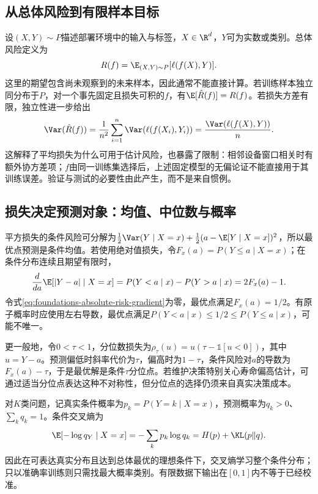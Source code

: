 \subsection{从总体风险到有限样本目标}
设$(X,Y)\sim P$描述部署环境中的输入与标签，$X\in\R^d$，$Y$可为实数或类别。总体风险定义为
\begin{equation}
 R(f)=\E_{(X,Y)\sim P}[\ell(f(X),Y)].
\end{equation}
这里的期望包含尚未观察到的未来样本，因此通常不能直接计算。若训练样本独立同分布于$P$，对一个事先固定且损失可积的$f$，有$\E[\hat R(f)]=R(f)$。若损失方差有限，独立性进一步给出
\begin{equation}
 \Var(\hat R(f))=\frac{1}{n^2}\sum_{i=1}^n\Var(\ell(f(X_i),Y_i))
 =\frac{\Var(\ell(f(X),Y))}{n}.
\end{equation}
这解释了平均损失为什么可用于估计风险，也暴露了限制：相邻设备窗口相关时有额外协方差项；$f$由同一训练集选择后，上述固定模型的无偏论证不能直接用于其训练误差。验证与测试的必要性由此产生，而不是来自惯例。

\subsection{损失决定预测对象：均值、中位数与概率}
平方损失的条件风险可分解为$\tfrac12\Var(Y\mid X=x)+\tfrac12(a-\E[Y\mid X=x])^2$，所以最优点预测是条件均值。若使用绝对值损失，令$F_x(a)=P(Y\leq a\mid X=x)$；在条件分布连续且期望有限时，
\begin{equation}
 \frac{d}{da}\E[|Y-a|\mid X=x]
 =P(Y<a\mid x)-P(Y>a\mid x)=2F_x(a)-1.\label{eq:foundations-absolute-risk-gradient}
\end{equation}
令式\eqref{eq:foundations-absolute-risk-gradient}为零，最优点满足$F_x(a)=1/2$。有原子概率时应使用左右导数，最优点满足$P(Y<a\mid x)\leq1/2\leq P(Y\leq a\mid x)$，可能不唯一。

更一般地，令$0<\tau<1$，分位数损失为$\rho_\tau(u)=u(\tau-\mathbb1[u<0])$，其中$u=Y-a$。预测偏低时斜率代价为$\tau$，偏高时为$1-\tau$，条件风险对$a$的导数为$F_x(a)-\tau$，于是最优解是条件$\tau$分位点。若维护决策特别关心寿命偏高估计，可通过适当分位点表达这种不对称性，但分位点的选择仍须来自真实决策成本。

对$K$类问题，记真实条件概率为$p_k=P(Y=k\mid X=x)$，预测概率为$q_k>0$、$\sum_kq_k=1$。条件交叉熵为
\begin{equation}
 \E[-\log q_Y\mid X=x]=-\sum_kp_k\log q_k
 =H(p)+\KL(p\|q).
\end{equation}
因此在可表达真实分布且达到总体最优的理想条件下，交叉熵学习整个条件分布；只以准确率训练则只需找最大概率类别。有限数据下输出在$[0,1]$内不等于已经校准。

